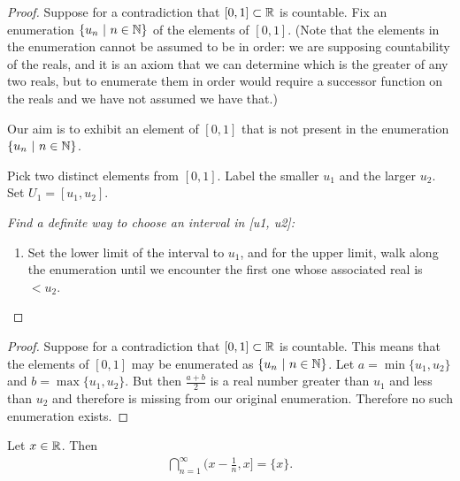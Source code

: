 \begin{proof}
  Suppose for a contradiction that $[0, 1] \subset \mathbb{R}$ is countable. Fix an enumeration $\{u_n ~|~ n \in \mathbb{N}\}$
  of the elements of $[0, 1]$. (Note that the elements in the enumeration cannot be assumed to be in order: we
  are supposing countability of the reals, and it is an axiom that we can determine which is the greater of any
  two reals, but to enumerate them in order would require a successor function on the reals and we have not
  assumed we have that.)

  Our aim is to exhibit an element of $[0, 1]$ that is not present in the enumeration$\{u_n ~|~ n \in \mathbb{N}\}$.

  Pick two distinct elements from $[0, 1]$. Label the smaller $u_1$ and the larger $u_2$. Set $U_1 = [u_1, u_2]$.

  {\it Find a definite way to choose an interval in [u1, u2]:}
  \begin{enumerate}
  \item Set the lower limit of the interval to $u_1$, and for the upper limit, walk along the enumeration until we
    encounter the first one whose associated real is $< u_2$.
  \end{enumerate}



\end{proof}


\begin{proof}
  Suppose for a contradiction that $[0, 1] \subset \mathbb{R}$ is countable. This means that the elements of $[0, 1]$
  may be enumerated as $\{u_n ~|~ n \in \mathbb{N}\}$. Let $a = \min\{u_1, u_2\}$ and $b = \max\{u_1, u_2\}$. But
  then $\frac{a + b}{2}$ is a real number greater than $u_1$ and less than $u_2$ and therefore is missing from
  our original enumeration. Therefore no such enumeration exists.


\end{proof}




\begin{lemma}
  Let $x \in \mathbb{R}$. Then
  \begin{align*}
    \bigcap_{n=1}^\infty \Big(x -\frac{1}{n}, x\Big] = \{x\}.
  \end{align*}
\end{lemma}

